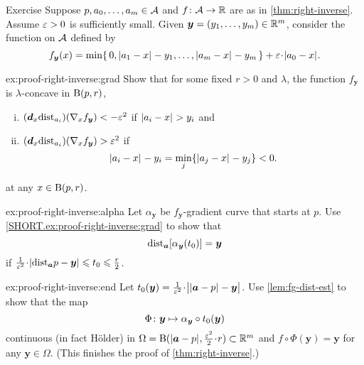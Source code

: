 \begin{thm}{Exercise}\label{ex:proof-right-inverse}
Suppose $p,a_0,\dots,a_m\in\mathcal{A}$ and $f\colon\mathcal{A}\to\mathbb{R}$ are as in \ref{thm:right-inverse}.
Assume $\varepsilon>0$ is sufficiently small.
Given $\bm{y}=(y_1,\dots,y_m)\in \mathbb{R}^m$, 
consider the function on $\mathcal{A}$ defined by
\[f_{\bm{y}}(x)=\min\{\,0, \dist{a_1}{x}{}-y_1,\dots,\dist{a_m}{x}{}-y_m\,\}+\eps\cdot\dist{a_0}{x}{}.\]


\begin{subthm}{ex:proof-right-inverse:grad}
Show that for some fixed $r>0$ and $\lambda$, the function $f_{\bm{y}}$ is $\lambda$-concave in $\mathrm{B}{}(p,r)$,
\begin{enumerate}[(i)]
\item\label{111} $(\bm{d}_x\mathrm{dist}_{a_i})(\nabla_x f_{\bm{y}})<-\varepsilon^2$ if $|{a_i}-{x}|_{}^{{}}>y_i$ and
\item\label{222} $(\bm{d}_x\mathrm{dist}_{a_i})(\nabla_x f_{\bm{y}})>\varepsilon^2$ if 
\[|{a_i}-{x}|_{}^{{}}-y_i=\min_j\{|{a_j}-{x}|_{}^{{}}-y_j\}<0.\]
\end{enumerate}
at any $x\in \mathrm{B}{}(p,r)$.

\end{subthm}

\begin{subthm}{ex:proof-right-inverse:alpha}
Let $\alpha_{\bm{y}}$ be $f_{\bm{y}}$-gradient curve that starts at $p$.
Use \ref{SHORT.ex:proof-right-inverse:grad} to show that 
\[
\mathrm{dist}_{\bm{a}}{[\alpha_{\bm{y}}(t_0)]}
= 
\bm{y}\]
if 
$\tfrac1{\eps^2}\cdot|\distfun_{\bm{a}}{p}-\bm{y}|
\le
t_0
\le
\tfrac{r}{2}$.

\end{subthm}

\begin{subthm}{ex:proof-right-inverse:end}
Let $t_0(\bm{y})=\tfrac{1}{\eps^2}\cdot\bigl|\dist{\bm{a}}{p}{}-\bm{y}\bigr|$.
Use \ref{lem:fg-dist-est} to show that the map
\[\Phi\colon{\bm{y}}\mapsto \alpha_{\bm{y}}\circ t_0(\bm{y})\]
continuous (in fact H\"older) in $\Omega=\oBall(\dist{\bm{a}}{p}{},\tfrac{\eps^2}{2}\cdot r )\subset\RR^m$
and $f\circ \Phi(\bm{y})=\bm{y}$ for any $\bm{y}\in \Omega$.
(This finishes the proof of \ref{thm:right-inverse}.)
\end{subthm}

\end{thm}


